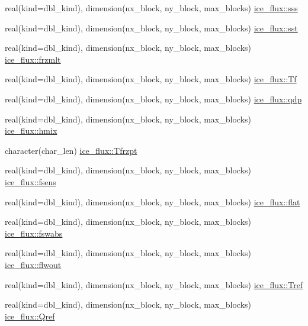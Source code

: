\begin{DoxyCompactItemize}
\item 
real(kind=dbl\_\-kind), dimension(nx\_\-block, ny\_\-block, max\_\-blocks) \hyperlink{namespaceice__flux_a0549ab71dd5d6a3d23fc54b03daa9aba}{ice\_\-flux::sss}
\item 
real(kind=dbl\_\-kind), dimension(nx\_\-block, ny\_\-block, max\_\-blocks) \hyperlink{namespaceice__flux_a760acd33d8c9c15ba312e94fc8b6cdec}{ice\_\-flux::sst}
\item 
real(kind=dbl\_\-kind), dimension(nx\_\-block, ny\_\-block, max\_\-blocks) \hyperlink{namespaceice__flux_af09eb2a499606f27cd8ba847a999df71}{ice\_\-flux::frzmlt}
\item 
real(kind=dbl\_\-kind), dimension(nx\_\-block, ny\_\-block, max\_\-blocks) \hyperlink{namespaceice__flux_a3facf6772fad8bd7af98c69cd56db10c}{ice\_\-flux::Tf}
\item 
real(kind=dbl\_\-kind), dimension(nx\_\-block, ny\_\-block, max\_\-blocks) \hyperlink{namespaceice__flux_a178c03fc7b766259d4b973b4d055aa1d}{ice\_\-flux::qdp}
\item 
real(kind=dbl\_\-kind), dimension(nx\_\-block, ny\_\-block, max\_\-blocks) \hyperlink{namespaceice__flux_ab583d7ec90095ce5df9f425a98b70dbd}{ice\_\-flux::hmix}
\item 
character(char\_\-len) \hyperlink{namespaceice__flux_a230173f0ff542e8f4cdc68f1c6a469f9}{ice\_\-flux::Tfrzpt}
\item 
real(kind=dbl\_\-kind), dimension(nx\_\-block, ny\_\-block, max\_\-blocks) \hyperlink{namespaceice__flux_ad76df6df986573fcb622fb418d960f37}{ice\_\-flux::fsens}
\item 
real(kind=dbl\_\-kind), dimension(nx\_\-block, ny\_\-block, max\_\-blocks) \hyperlink{namespaceice__flux_ab2d967d4946f473fc077416bdd6cd13f}{ice\_\-flux::flat}
\item 
real(kind=dbl\_\-kind), dimension(nx\_\-block, ny\_\-block, max\_\-blocks) \hyperlink{namespaceice__flux_af3384816a4840e4df4c79f158e6e9762}{ice\_\-flux::fswabs}
\item 
real(kind=dbl\_\-kind), dimension(nx\_\-block, ny\_\-block, max\_\-blocks) \hyperlink{namespaceice__flux_a1ec39d9db775aa2496c0c0ad3ab9c8e4}{ice\_\-flux::flwout}
\item 
real(kind=dbl\_\-kind), dimension(nx\_\-block, ny\_\-block, max\_\-blocks) \hyperlink{namespaceice__flux_a6a0b5fa95bab43f29f8cbd6cbd8f047f}{ice\_\-flux::Tref}
\item 
real(kind=dbl\_\-kind), dimension(nx\_\-block, ny\_\-block, max\_\-blocks) \hyperlink{namespaceice__flux_ac332e72481b7da42322f9e2581f09434}{ice\_\-flux::Qref}

\end{DoxyCompactItemize}
